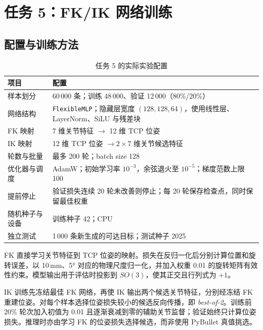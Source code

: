 \documentclass[12pt,a4paper,UTF8]{ctexart}
\begin{document}
\section{任务 5：FK/IK 网络训练}
\subsection{配置与训练方法}
\begin{table}[!htbp]
\centering\small
\caption{任务 5 的实际实验配置}\label{tab:train_config}
\begin{tabularx}{\textwidth}{@{}p{2.9cm}X@{}}
\toprule
项目 & 配置\\ \midrule
样本划分 & 60\,000 条；训练 48\,000、验证 12\,000（80\%/20\%）\\
网络结构 & \texttt{FlexibleMLP}；隐藏层宽度 $(128,128,64)$，使用线性层、LayerNorm、SiLU 与残差块\\
FK 映射 & 7 维关节特征 $\rightarrow$ 12 维 TCP 位姿\\
IK 映射 & 12 维 TCP 位姿 $\rightarrow 2\times7$ 维关节候选特征\\
轮数与批量 & 最多 200 轮；batch size 128\\
优化器与调度 & AdamW；初始学习率 $10^{-3}$，余弦退火至 $10^{-5}$；梯度范数上限 100\\
提前停止 & 验证损失连续 20 轮未改善则停止；每 20 轮保存检查点，同时保留最佳权重\\
随机种子与设备 & 训练种子 42；CPU\\
独立测试 & 1\,000 条新生成的可达目标；测试种子 2025\\ \bottomrule
\end{tabularx}
\end{table}
FK 直接学习关节特征到 TCP 位姿的映射。损失在反归一化后分别计算位置和旋转误差，以 10\,mm、5° 对应的物理尺度归一化，并加入权重 0.01 的旋转矩阵有效性约束。模型输出用于评估时投影到 $SO(3)$，使其正交且行列式为 $+1$。

IK 训练先冻结最佳 FK 网络，再使 IK 输出两个候选关节特征，分别经冻结 FK 重建位姿。对每个样本选择位姿损失较小的候选反向传播，即 \emph{best-of-2}。训练前 20\% 轮次加入初值为 0.01 且逐渐衰减到零的辅助关节监督；验证始终只计算位姿损失。推理时亦由学习 FK 的位姿损失选择候选，而非使用 PyBullet 真值挑选。
\end{document}
